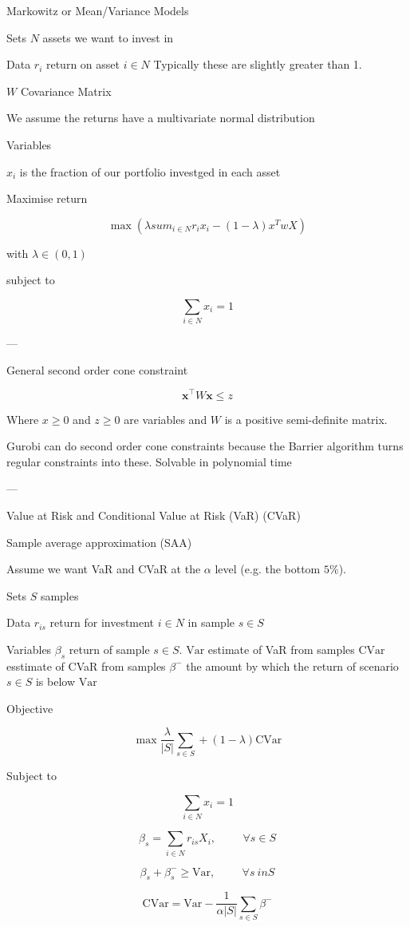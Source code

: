 Markowitz or Mean/Variance Models

Sets
$N$ assets we want to invest in

Data
$r_i$ return on asset $i \in N$
Typically these are slightly greater than 1.

$W$ Covariance Matrix

We assume the returns have a multivariate normal distribution

Variables

$x_i$ is the fraction of our portfolio investged in each asset

Maximise return

\[\max (\lambda sum_{i\in N} r_i x_i - (1-\lambda) x^T w X)\]

with
$\lambda \in (0,1)$

subject to

\[\sum_{i\in N} x_i = 1\]

---

General second order cone constraint

\[\boldsymbol{x}^\top W \boldsymbol{x} \le z\]

Where $x\ge 0$ and $z \ge 0$ are variables and $W$ is a positive semi-definite matrix.



Gurobi can do second order cone constraints because the Barrier algorithm turns regular constraints into these.
Solvable in polynomial time

---

Value at Risk and Conditional Value at Risk
(VaR) (CVaR)

Sample average approximation (SAA)

Assume we want VaR and CVaR at the $\alpha$ level (e.g. the bottom $5\%$).

Sets
$S$ samples

Data
$r_{is}$ return for investment $i \in N$ in sample $s \in S$

Variables
$\beta_s$ return of sample $s \in S$.
$\text{Var}$ estimate of VaR from samples
$\text{CVar}$ esstimate of CVaR from samples
$\beta^{-}$ the amount by which the return of scenario $s \in S$ is below $\text{Var}$

Objective

\[ \max \frac{\lambda}{|S|} \sum_{s \in S} + (1 - \lambda)\text{CVar} \]

Subject to

\[ \sum_{i\in N} x_i = 1 \]

\[ \beta_s = \sum_{ i \in N } r_{is} X_i, \hspace{1cm} \forall s \in S \]

\[ \beta_s + \beta_s^{-} \ge \text{Var}, \hspace{1cm} \forall s \ in S \]

\[ \text{CVar} = \text{Var} - \frac{1}{\alpha |S|} \sum_{s \in S} \beta^{-} \]

